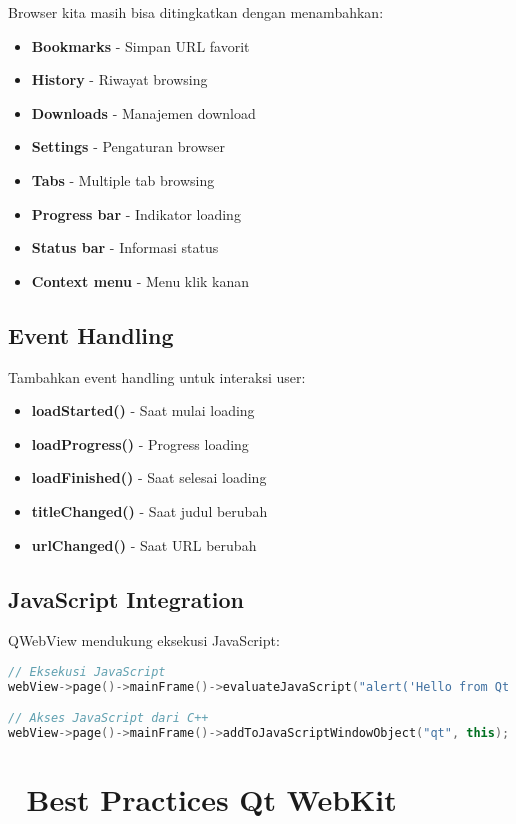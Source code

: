Browser kita masih bisa ditingkatkan dengan menambahkan:

\begin{itemize}
\item \textbf{Bookmarks} - Simpan URL favorit
\item \textbf{History} - Riwayat browsing
\item \textbf{Downloads} - Manajemen download
\item \textbf{Settings} - Pengaturan browser
\item \textbf{Tabs} - Multiple tab browsing
\item \textbf{Progress bar} - Indikator loading
\item \textbf{Status bar} - Informasi status
\item \textbf{Context menu} - Menu klik kanan
\end{itemize}

\subsection{Event Handling}

Tambahkan event handling untuk interaksi user:

\begin{itemize}
\item \textbf{loadStarted()} - Saat mulai loading
\item \textbf{loadProgress()} - Progress loading
\item \textbf{loadFinished()} - Saat selesai loading
\item \textbf{titleChanged()} - Saat judul berubah
\item \textbf{urlChanged()} - Saat URL berubah
\end{itemize}

\subsection{JavaScript Integration}

QWebView mendukung eksekusi JavaScript:

\begin{lstlisting}[language=c++]
// Eksekusi JavaScript
webView->page()->mainFrame()->evaluateJavaScript("alert('Hello from Qt!')");

// Akses JavaScript dari C++
webView->page()->mainFrame()->addToJavaScriptWindowObject("qt", this);
\end{lstlisting}

\section{🔧 Best Practices Qt WebKit}

